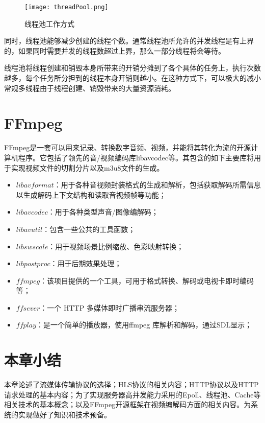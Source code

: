 \documentclass[bachelor]{thesis-uestc}
\begin{document}
\begin{figure}[h]
\texttt{[image: threadPool.png]}
\caption{线程池工作方式}
\label{线程池工作方式} 
\end{figure}

同时，线程池能够减少创建的线程个数。通常线程池所允许的并发线程是有上界的，如果同时需要并发的线程数超过上界，那么一部分线程将会等待。

线程池将线程创建和销毁本身所带来的开销分摊到了各个具体的任务上，执行次数越多，每个任务所分担到的线程本身开销则越小。在这种方式下，可以极大的减小常规多线程由于线程创建、销毁带来的大量资源消耗。


\section{FFmpeg}

FFmpeg是一套可以用来记录、转换数字音频、视频，并能将其转化为流的开源计算机程序。它包括了领先的音/视频编码库libavcodec等。其包含的如下主要库将用于实现视频文件的切割分片以及m3u8文件的生成。

\begin{itemize}
	\item $libavformat$：用于各种音视频封装格式的生成和解析，包括获取解码所需信息以生成解码上下文结构和读取音视频帧等功能；
	\item $libavcodec$：用于各种类型声音/图像编解码；
	\item $libavutil$：包含一些公共的工具函数；
	\item $libswscale$：用于视频场景比例缩放、色彩映射转换；
	\item $libpostproc$：用于后期效果处理；
	\item $ffmpeg$：该项目提供的一个工具，可用于格式转换、解码或电视卡即时编码等；
	\item $ffsever$：一个 HTTP 多媒体即时广播串流服务器；
	\item $ffplay$：是一个简单的播放器，使用ffmpeg 库解析和解码，通过SDL显示；
\end{itemize}


\section{本章小结}

本章论述了流媒体传输协议的选择；HLS协议的相关内容；HTTP协议以及HTTP请求处理的基本内容；为了实现服务器高并发能力采用的Epoll、线程池、Cache等相关技术的基本概念；以及FFmpeg开源框架在视频编解码方面的相关内容。为系统的实现做好了知识和技术预备。
\end{document}
